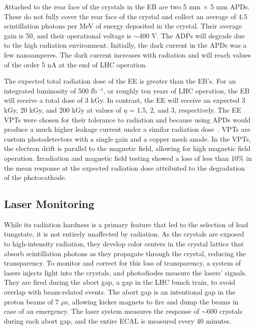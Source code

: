 Attached to the rear face of the crystals in the EB are two 5 mm $\times$ 5 mm APDs. These do not fully cover the rear face of the crystal and collect an average of 4.5 scintillation photons per MeV of energy deposited in the crystal. Their average gain is 50, and their operational voltage is $\sim$400 V. The ADPs will degrade due to the high radiation environment. Initially, the dark current in the APDs was a few nanoamperes. The dark current increases with radiation and will reach values of the order 5 nA at the end of LHC operation.

The expected total radiation dose of the EE is greater than the EB's. For an integrated luminosity of 500 fb$^{-1}$, or roughly ten years of LHC operation, the EB will receive a total dose of 3 kGy. In contrast, the EE will receive an expected 3 kGy, 20 kGy, and 200 kGy at values of $\eta$ = 1.5, 2, and 3, respectively.
The EE VPTs were chosen for their tolerance to radiation and because using APDs would produce a much higher leakage current under a similar radiation dose~\cite{ecal:tdr:1997}. VPTs are custom photodetectors with a single gain and a copper mesh anode. In the VPTs, the electron drift is parallel to the magnetic field, allowing for high magnetic field operation. Irradiation and magnetic field testing showed a loss of less than 10\% in the mean response at the expected radiation dose attributed to the degradation of the photocathode. 

\subsection{Laser Monitoring}

While its radiation hardness is a primary feature that led to the selection of lead tungstate, it is not entirely unaffected by radiation. As the crystals are exposed to high-intensity radiation, they develop color centers in the crystal lattice that absorb scintillation photons as they propagate through the crystal, reducing the transparency. To monitor and correct for this loss of transparency, a system of lasers injects light into the crystals, and photodiodes measure the lasers' signals. They are fired during the abort gap, a gap in the LHC bunch train, to avoid overlap with beam-related events. The abort gap is an intentional gap in the proton beams of 7 $\mu$s, allowing kicker magnets to fire and dump the beams in case of an emergency. The laser system measures the response of $\sim$600 crystals during each abort gap, and the entire ECAL is measured every 40 minutes.

